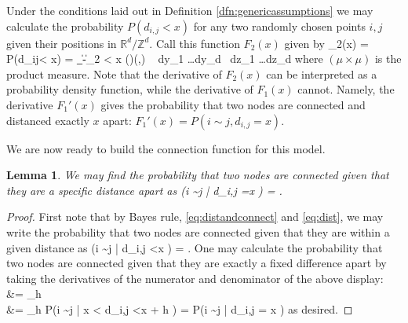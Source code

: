 \documentclass[11]{article}
\newcommand{\sanote}{\todo[color=violet!30]}
\def\ba #1\ea{\begin{align} #1 \end{align}}
\def\bas #1\eas{\begin{align*} #1 \end{align*}}
\newcommand{\varep}{\varepsilon}
\newtheorem{lem}[thm]{Lemma}
\theoremstyle{remark}
\theoremstyle{definition}
\begin{document}
Under the conditions laid out in Definition \ref{dfn:genericassumptions} we may calculate the probability $P( d_{i,j} <x )$  for any two randomly chosen points $i,j$ given their positions  in $\mathbb{R}^d / \mathbb{Z}^d$. Call this function $F_2(x)$ given by \ba F_2(x) = P(d_{ij}< x) = \idotsint_{\|-\|_2 < x}  (\mu \times \mu)(,) ~ dy_1 \ldots dy_d~ dz_1 \ldots dz_d \label{eq:dist}\ea %
where $(\mu \times \mu)$ is the product measure.
Note that the derivative of $F_2(x)$ can be interpreted as a probability density function, while the derivative of $F_1(x)$ cannot. Namely, the derivative $F_1'(x)$ gives the probability that two nodes are connected and distanced exactly $x$ apart: $F_1'(x) = P(i \sim j, d_{i,j} = x)$.



We are now ready to build the connection function for this model.

\begin{lem} \label{res:Pij|distance}
We may find the probability that two nodes are connected given that they are a specific distance apart as
\bas  P(i \sim j | d_{i,j} =x ) =  \;.\eas
\end{lem}

\begin{proof}
First note that by Bayes rule, \eqref{eq:distandconnect} and \eqref{eq:dist}, we may write the probability that two nodes are connected given that they are within a given distance as \ba P(i \sim j | d_{i,j} <x ) =  \;. \label{eq::f1overf2} \ea One may calculate the probability that two nodes are connected given that they are exactly a fixed difference apart by taking the derivatives of the numerator and denominator of the above display:
\ba 
\frac{ F_1'(x)}{ F_2'(x)} &= \lim_{h }  \\ &= \lim_{h } P(i \sim j | x < d_{i,j} <x + h  ) =  P(i \sim j | d_{i,j}  =  x )\label{eq:congivendistpdf} \ea as desired. 
\end{proof}
\end{document}
